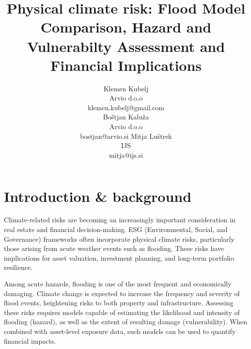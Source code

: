 \documentclass[a4paper,10.80pt,twoside]{article}
\begin{document}
    \title{Physical climate risk: Flood Model Comparison, Hazard and Vulnerabilty Assessment and Financial Implications}
    \author{Klemen Kubelj \\
        Arvio d.o.o\\
        klemen.kubelj@gmail.com \\
        \AndAuthor
        Boštjan Kaluža\\
        Arvio d.o.o\\
        bostjan@arvio.si
        \AndAuthor
        Mitja Luštrek\\
        IJS\\
        mitja@ijs.si}
    

\maketitle
    
\section{Introduction \& background}

Climate-related risks are becoming an increasingly important consideration in real estate and financial decision-making. ESG (Environmental, Social, and Governance) frameworks often incorporate physical climate risks, particularly those arising from acute weather events such as flooding. These risks have implications for asset valuation, investment planning, and long-term portfolio resilience.

Among acute hazards, flooding is one of the most frequent and economically damaging. Climate change is expected to increase the frequency and severity of flood events, heightening risks to both property and infrastructure. Assessing these risks requires models capable of estimating the likelihood and intensity of flooding (hazard), as well as the extent of resulting damage (vulnerability). When combined with asset-level exposure data, such models can be used to quantify financial impacts.
\end{document}
